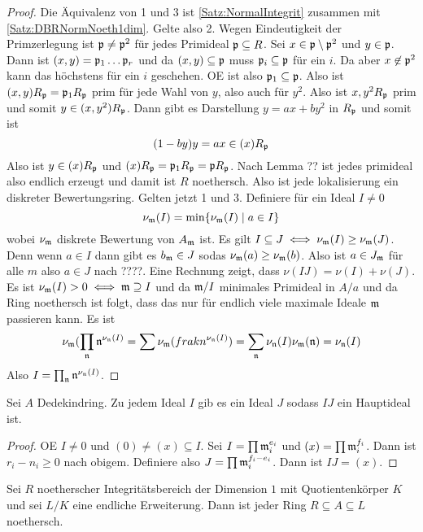 \begin{proof}
	Die Äquivalenz von 1 und 3 ist \cref{Satz:NormalIntegrit} zusammen mit \cref{Satz:DBRNormNoeth1dim}.
	Gelte also 2. Wegen Eindeutigkeit der Primzerlegung ist \(\mathfrak{p}\neq \mathfrak{p}^2\) für jedes Primideal \(\mathfrak{p}\subseteq R\).
	Sei \(x\in \mathfrak{p}\setminus\mathfrak{p}^2\) und \(y\in\mathfrak{p}\). Dann ist \((x,y)=\mathfrak{p}_1\dots\mathfrak{p}_r\) und da 
	\((x,y)\subseteq\mathfrak{p}\) muss \(\mathfrak{p}_i\subseteq \mathfrak{p}\) für ein \(i\). Da aber \(x\not\in\mathfrak{p}^2\) kann 
	das höchstens für ein \(i\) geschehen. OE ist also \(\mathfrak{p}_1\subseteq \mathfrak{p}\).
	Also ist \((x,y)R_{\mathfrak{p}}=\mathfrak{p}_1R_{\mathfrak{p}}\) prim für jede Wahl von \(y\), also auch für \(y^2\).
	Also ist \(x,y^2R_{\mathfrak{p}}\) prim und somit \(y\in (x,y^2)R_{\mathfrak{p}}\). Dann gibt es Darstellung 
	\(y=ax+by^2\) in \(R_{\mathfrak{p}}\) und somit ist \[(1-by)y=ax\in (x)R_{\mathfrak{p}}\] Also ist \(y\in (x)R_{\mathfrak{p}}\) und \((x)R_{\mathfrak{p}}=\mathfrak{p}_1R_{\mathfrak{p}}=\mathfrak{p} R_{\mathfrak{p}}\).
	Nach Lemma ?? ist jedes primideal also endlich erzeugt und damit ist \(R\) noethersch. Also ist jede lokalisierung ein diskreter Bewertungsring.
	Gelten jetzt 1 und 3. Definiere für ein Ideal \(I\neq 0\) 
	\[\nu_{\mathfrak{m}}(I)=\min\{\nu_{\mathfrak{m}}(I)\mid a\in I\}\] wobei \(\nu_{\mathfrak{m}}\) diskrete Bewertung von \(A_{\mathfrak{m}}\) ist.
	Es gilt \(I\subseteq J\iff \nu_{\mathfrak{m}}(I)\geq \nu_{\mathfrak{m}}(J)\). Denn wenn \(a\in I\) dann gibt es \(b_{\mathfrak{m}}\in J\)
	sodas \(\nu_{\mathfrak{m}}(a)\geq\nu_{\mathfrak{m}}(b)\).
	Also ist \(a\in J_{\mathfrak{m}}\) für alle \(m\) also \(a\in J\) nach ????.
	Eine Rechnung zeigt, dass \(\nu(IJ)=\nu(I)+\nu(J)\).
	Es ist \(\nu_{\mathfrak{m}}(I)>0 \iff \mathfrak{m}\supseteq I\) und da \(\mathfrak{m}/I\) minimales Primideal in \(A/a\)
	und da Ring noethersch ist folgt, dass das nur für endlich viele maximale Ideale \(\mathfrak{m}\) passieren kann.
	Es ist 
	\[\nu_{\mathfrak{m}}(\prod_{\mathfrak{n}} \mathfrak{n}^{\nu_{\mathfrak{n}}(I)}=\sum\nu_{\mathfrak{m}}(frakn^{\nu_{\mathfrak{n}}(I)})=
	\sum_{\mathfrak{n}} \nu_{\mathfrak{n}}(I)\nu_{\mathfrak{m}}(\mathfrak{n})=\nu_{\mathfrak{n}}(I)\]
	Also \(I=\prod_{\mathfrak{n}} \mathfrak{n}^{\nu_{\mathfrak{n}}(I)}\).
\end{proof}
\begin{Lemma}
	Sei \(A\) Dedekindring. Zu jedem Ideal \(I\) gib es ein Ideal \(J\) sodass \(IJ\) ein Hauptideal ist.
\end{Lemma}
\begin{proof}
	OE \(I\neq 0\) und \((0)\neq (x)\subseteq I\).
	Sei \(I=\prod \mathfrak{m}_i^{e_i}\) und \((x)=\prod \mathfrak{m}_i^{f_i}\).
	Dann ist \(r_i-n_i\geq 0\) nach obigem.
	Definiere also \(J=\prod \mathfrak{m}_i^{f_i-e_i}\). Dann ist \(IJ=(x)\).
\end{proof}
\begin{Lemma}
	Sei \(R\) noetherscher Integritätsbereich der Dimension \(1\) mit Quotientenkörper \(K\) und sei \(L/K\) eine endliche
	Erweiterung. Dann ist jeder Ring \(R\subseteq A\subseteq L\) noethersch.
\end{Lemma}
